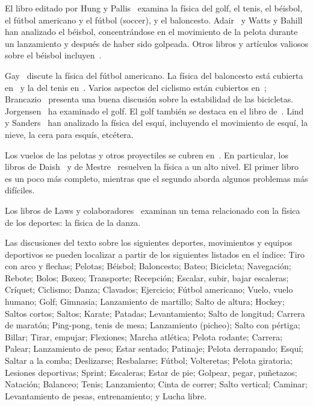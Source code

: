 \documentclass[12pt,a4paper]{book}
\begin{document}
El libro editado por Hung y Pallis~\cite{g18} examina la física del golf, el tenis, el béisbol, el fútbol americano y el fútbol (soccer), y el baloncesto. Adair~\cite{g1, g2} y Watts y Bahill~\cite{g28} han analizado el béisbol, concentrándose en el movimiento de la pelota durante un lanzamiento y después de haber sido golpeada. Otros libros y artículos valiosos sobre el béisbol incluyen~\cite{g7, g25}.

Gay~\cite{g15} discute la física del fútbol americano. La física del baloncesto está cubierta en~\cite{g12} y la del tenis en~\cite{g5}. Varios aspectos del ciclismo están cubiertos en~\cite{g6}; Brancazio~\cite{g4} presenta una buena discusión sobre la estabilidad de las bicicletas. Jorgensen~\cite{g19} ha examinado el golf. El golf también se destaca en el libro de~\cite{g8}. Lind y Sanders~\cite{g24} han analizado la física del esquí, incluyendo el movimiento de esquí, la nieve, la cera para esquís, etcétera.

Los vuelos de las pelotas y otros proyectiles se cubren en~\cite{g4, g7, g8, g16, g26}. En particular, los libros de Daish~\cite{g8} y de Mestre~\cite{g9} resuelven la física a un alto nivel. El primer libro es un poco más completo, mientras que el segundo aborda algunos problemas más difíciles.

Los libros de Laws y colaboradores~\cite{g11, g20, g21, g22, g23} examinan un tema relacionado con la física de los deportes: la física de la danza.

Las discusiones del texto sobre los siguientes deportes, movimientos y equipos deportivos se pueden localizar a partir de los siguientes listados en el índice: Tiro con arco y flechas; Pelotas; Béisbol; Baloncesto; Bateo; Bicicleta; Navegación; Rebote; Bolos; Boxeo; Transporte; Recepción; Escalar, subir, bajar escaleras; Críquet; Ciclismo; Danza; Clavados; Ejercicio; Fútbol americano; Vuelo, vuelo humano; Golf; Gimnasia; Lanzamiento de martillo; Salto de altura; Hockey; Saltos cortos; Saltos; Karate; Patadas; Levantamiento; Salto de longitud; Carrera de maratón; Ping-pong, tenis de mesa; Lanzamiento (picheo); Salto con pértiga; Billar; Tirar, empujar; Flexiones; Marcha atlética; Pelota rodante; Carrera; Palear; Lanzamiento de peso; Estar sentado; Patinaje; Pelota derrapando; Esquí; Saltar a la comba; Deslizarse; Resbalarse; Fútbol; Volteretas; Pelota giratoria; Lesiones deportivas; Sprint; Escaleras; Estar de pie; Golpear, pegar, puñetazos; Natación; Balanceo; Tenis; Lanzamiento; Cinta de correr; Salto vertical; Caminar; Levantamiento de pesas, entrenamiento; y Lucha libre.
\end{document}
